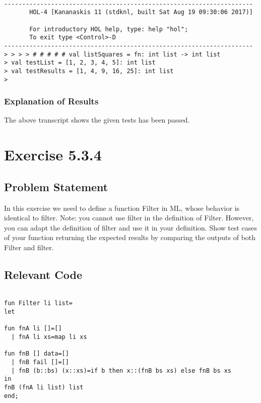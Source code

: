 \documentclass{report}
\begin{document}
\setcounter{sessioncount}{0}
\begin{session}
  \begin{scriptsize}
\begin{verbatim}

---------------------------------------------------------------------
       HOL-4 [Kananaskis 11 (stdknl, built Sat Aug 19 09:30:06 2017)]

       For introductory HOL help, type: help "hol";
       To exit type <Control>-D
---------------------------------------------------------------------
> > > > # # # # # val listSquares = fn: int list -> int list
> val testList = [1, 2, 3, 4, 5]: int list
> val testResults = [1, 4, 9, 16, 25]: int list
> 
\end{verbatim}
  \end{scriptsize}
\end{session}

\subsection{Explanation of Results}
\label{sec:explanation-results-2}

The above transcript shows the given tests has been passed.



\chapter{Exercise 5.3.4}
\label{cha:exercise-5.3.4}

\section{Problem Statement}
\label{sec:problem-statement-3}
In this exercise we need to define a function Filter in ML, whose
behavior is identical to filter. Note: you cannot use filter in the
definition of Filter. However, you can adapt the definition of filter
and use it in your definition.  Show test cases of your function
returning the expected results by comparing the outputs of both Filter
and filter.

\section{Relevant Code}
\label{sec:relevant-code-3}


\lstset{frameround=tttt}
\begin{lstlisting}[frame=tRBL]

fun Filter li list=
let

fun fnA li []=[]
  | fnA li xs=map li xs

fun fnB [] data=[]
  | fnB fail []=[]
  | fnB (b::bs) (x::xs)=if b then x::(fnB bs xs) else fnB bs xs
in
fnB (fnA li list) list
end;

\end{lstlisting}
\end{document}

